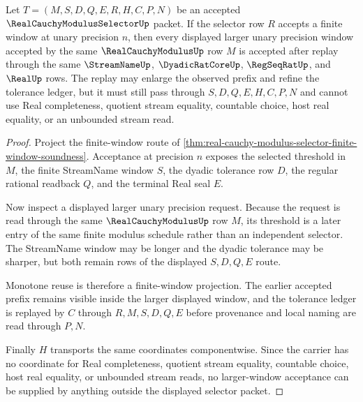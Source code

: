\begin{theorem}
\label{thm:real-cauchy-modulus-selector-window-monotone}
Let $T=(M,S,D,Q,E,R,H,C,P,N)$ be an accepted $\RealCauchyModulusSelectorUp$ packet. If the selector row $R$ accepts a finite window at unary precision $n$, then every displayed larger unary precision window accepted by the same $\RealCauchyModulusUp$ row $M$ is accepted after replay through the same $\StreamNameUp$, $\DyadicRatCoreUp$, $\RegSeqRatUp$, and $\RealUp$ rows. The replay may enlarge the observed prefix and refine the tolerance ledger, but it must still pass through $S,D,Q,E,H,C,P,N$ and cannot use Real completeness, quotient stream equality, countable choice, host real equality, or an unbounded stream read.
\end{theorem}
\begin{proof}
Project the finite-window route of \autoref{thm:real-cauchy-modulus-selector-finite-window-soundness}. Acceptance at precision $n$ exposes the selected threshold in $M$, the finite StreamName window $S$, the dyadic tolerance row $D$, the regular rational readback $Q$, and the terminal Real seal $E$.

Now inspect a displayed larger unary precision request. Because the request is read through the same $\RealCauchyModulusUp$ row $M$, its threshold is a later entry of the same finite modulus schedule rather than an independent selector. The StreamName window may be longer and the dyadic tolerance may be sharper, but both remain rows of the displayed $S,D,Q,E$ route.

Monotone reuse is therefore a finite-window projection. The earlier accepted prefix remains visible inside the larger displayed window, and the tolerance ledger is replayed by $C$ through $R,M,S,D,Q,E$ before provenance and local naming are read through $P,N$.

Finally $H$ transports the same coordinates componentwise. Since the carrier has no coordinate for Real completeness, quotient stream equality, countable choice, host real equality, or unbounded stream reads, no larger-window acceptance can be supplied by anything outside the displayed selector packet.
\end{proof}

